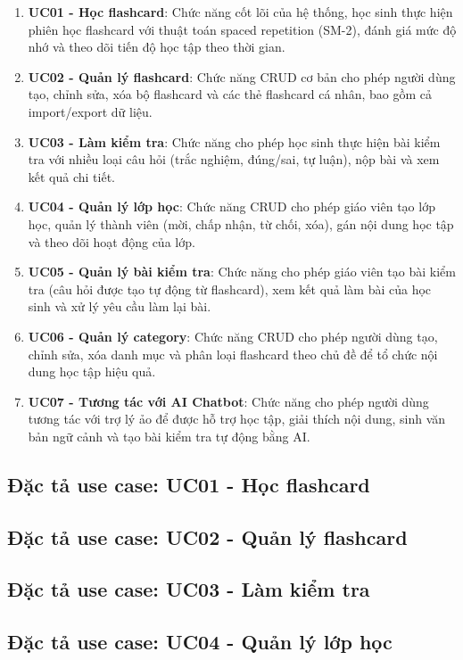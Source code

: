 \documentclass[../DoAn.tex]{subfiles}
\begin{document}
\begin{enumerate}
    \item \textbf{UC01 - Học flashcard}: Chức năng cốt lõi của hệ thống, học sinh thực hiện phiên học flashcard với thuật toán spaced repetition (SM-2), đánh giá mức độ nhớ và theo dõi tiến độ học tập theo thời gian.
    \item \textbf{UC02 - Quản lý flashcard}: Chức năng CRUD cơ bản cho phép người dùng tạo, chỉnh sửa, xóa bộ flashcard và các thẻ flashcard cá nhân, bao gồm cả import/export dữ liệu.
    \item \textbf{UC03 - Làm kiểm tra}: Chức năng cho phép học sinh thực hiện bài kiểm tra với nhiều loại câu hỏi (trắc nghiệm, đúng/sai, tự luận), nộp bài và xem kết quả chi tiết.
    \item \textbf{UC04 - Quản lý lớp học}: Chức năng CRUD cho phép giáo viên tạo lớp học, quản lý thành viên (mời, chấp nhận, từ chối, xóa), gán nội dung học tập và theo dõi hoạt động của lớp.
    \item \textbf{UC05 - Quản lý bài kiểm tra}: Chức năng cho phép giáo viên tạo bài kiểm tra (câu hỏi được tạo tự động từ flashcard), xem kết quả làm bài của học sinh và xử lý yêu cầu làm lại bài.
    \item \textbf{UC06 - Quản lý category}: Chức năng CRUD cho phép người dùng tạo, chỉnh sửa, xóa danh mục và phân loại flashcard theo chủ đề để tổ chức nội dung học tập hiệu quả.
    \item \textbf{UC07 - Tương tác với AI Chatbot}: Chức năng cho phép người dùng tương tác với trợ lý ảo để được hỗ trợ học tập, giải thích nội dung, sinh văn bản ngữ cảnh và tạo bài kiểm tra tự động bằng AI.
\end{enumerate}

\subsection{Đặc tả use case: UC01 - Học flashcard}
\hfill

\subsection{Đặc tả use case: UC02 - Quản lý flashcard}
\hfill

\subsection{Đặc tả use case: UC03 - Làm kiểm tra}
\hfill

\subsection{Đặc tả use case: UC04 - Quản lý lớp học}
\hfill
\end{document}

